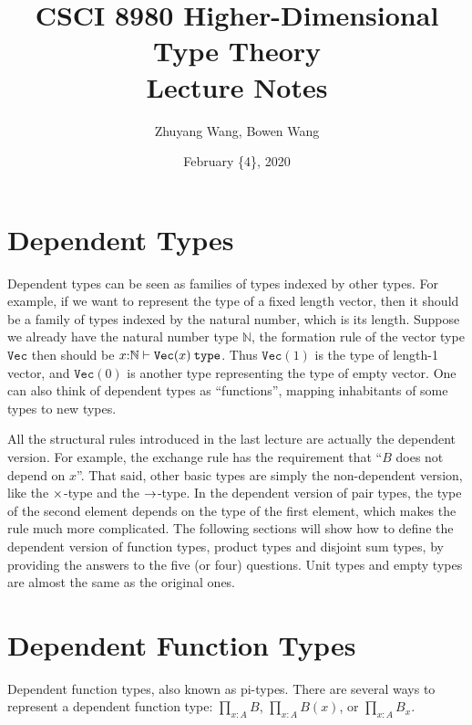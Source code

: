 \documentclass[11pt]{article}
\title{CSCI 8980 Higher-Dimensional Type Theory\\ Lecture Notes}
\author{Zhuyang Wang, Bowen Wang}
\date{February \{4\}, 2020}
\begin{document}
\maketitle

\section{Dependent Types}
Dependent types can be seen as families of types indexed by other types. For example, if we want to represent the type of a fixed length vector, then it should be a family of types indexed by the natural number, which is its length. Suppose we already have the natural number type $\mathbb{N}$, the formation rule of the vector type $\mathtt{Vec}$ then should be $\istype{x{:}\mathbb{N}}{\mathtt{Vec}(x)}$. Thus $\mathtt{Vec}(1)$ is the type of length-1 vector, and $\mathtt{Vec}(0)$ is another type representing the type of empty vector. One can also think of dependent types as ``functions'', mapping inhabitants of some types to new types.

All the structural rules introduced in the last lecture are actually the dependent version. For example, the exchange rule has the requirement that ``$B$ does not depend on $x$''. That said, other basic types are simply the non-dependent version, like the $\pairtype$-type and the $\funtype$-type. In the dependent version of pair types, the type of the second element depends on the type of the first element, which makes the rule much more complicated. The following sections will show how to define the dependent version of function types, product types and disjoint sum types, by providing the answers to the five (or four) questions. Unit types and empty types are almost the same as the original ones.

\section{Dependent Function Types}
Dependent function types, also known as pi-types. There are several ways to represent a dependent function type: $\displaystyle \prod_{x:A} B$, $\displaystyle \prod_{x:A} B(x)$, or $\displaystyle \prod_{x:A} B_x$.
\end{document}
